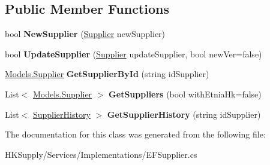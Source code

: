 \subsection*{Public Member Functions}
\begin{DoxyCompactItemize}
\item 
\mbox{\label{class_h_k_supply_1_1_services_1_1_implementations_1_1_e_f_supplier_ac6007f14e02bd817674f4a67058a0d56}} 
bool {\bfseries New\+Supplier} (\mbox{\hyperlink{class_h_k_supply_1_1_models_1_1_supplier}{Supplier}} new\+Supplier)
\item 
\mbox{\label{class_h_k_supply_1_1_services_1_1_implementations_1_1_e_f_supplier_aa4fb3668e36d6d76e84840be157e3632}} 
bool {\bfseries Update\+Supplier} (\mbox{\hyperlink{class_h_k_supply_1_1_models_1_1_supplier}{Supplier}} update\+Supplier, bool new\+Ver=false)
\item 
\mbox{\label{class_h_k_supply_1_1_services_1_1_implementations_1_1_e_f_supplier_a302b3d6f8fed58b7f804cd645a513384}} 
\mbox{\hyperlink{class_h_k_supply_1_1_models_1_1_supplier}{Models.\+Supplier}} {\bfseries Get\+Supplier\+By\+Id} (string id\+Supplier)
\item 
\mbox{\label{class_h_k_supply_1_1_services_1_1_implementations_1_1_e_f_supplier_ab6fe5acb35fa05ed5717c94d196c44a9}} 
List$<$ \mbox{\hyperlink{class_h_k_supply_1_1_models_1_1_supplier}{Models.\+Supplier}} $>$ {\bfseries Get\+Suppliers} (bool with\+Etnia\+Hk=false)
\item 
\mbox{\label{class_h_k_supply_1_1_services_1_1_implementations_1_1_e_f_supplier_a9c2d4b8e1223daaf655aabf512672e27}} 
List$<$ \mbox{\hyperlink{class_h_k_supply_1_1_models_1_1_supplier_history}{Supplier\+History}} $>$ {\bfseries Get\+Supplier\+History} (string id\+Supplier)
\end{DoxyCompactItemize}


The documentation for this class was generated from the following file\+:\begin{DoxyCompactItemize}
\item 
H\+K\+Supply/\+Services/\+Implementations/E\+F\+Supplier.\+cs\end{DoxyCompactItemize}
